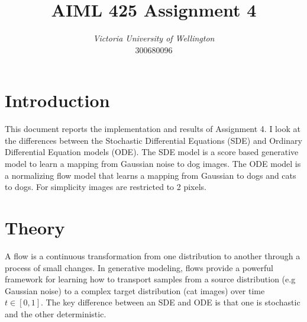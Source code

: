 \documentclass[conference,a4paper]{IEEEtran}
\begin{document}
\title{AIML 425 Assignment 4 %
}

\author{
\textit{Victoria University of Wellington}\\
300680096}


\maketitle

\section{Introduction}

This document reports the implementation and results of Assignment 4. I look at the differences between the Stochastic Differential Equations (SDE) and Ordinary Differential Equation models (ODE). The SDE model is a score based generative model to learn a mapping from Gaussian noise to dog images. The ODE model is a normalizing flow model that learns a mapping from Gaussian to dogs and cats to dogs. For simplicity images are restricted to 2 pixels.

\section{Theory}

A flow is a continuous transformation from one distribution to another through a process of small changes. In generative modeling, flows provide a powerful framework for learning how to transport samples from a source distribution (e.g Gaussian noise) to a complex target distribution (cat images) over time $t \in [0, 1]$. The key difference between an SDE and ODE is that one is stochastic and the other deterministic.
\end{document}
